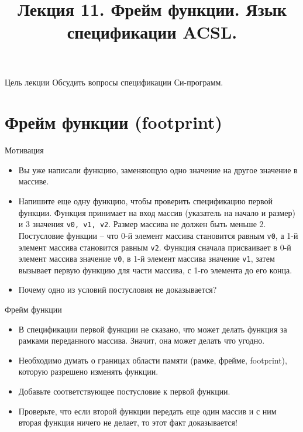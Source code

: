 \documentclass[hyperref={unicode=true}]{beamer}
\title{Лекция 11. Фрейм функции. Язык спецификации ACSL.}
\author{}
\date{}
\begin{document}
	\begin{frame}{}
		\titlepage
	\end{frame}

    \begin{frame}{Цель лекции}
    Обсудить вопросы спецификации Си-программ.
    \end{frame}

    \section{Фрейм функции (footprint)}

    \begin{frame}{Мотивация}
    \begin{itemize}
    \item
    Вы уже написали функцию, заменяющую
    одно значение на другое значение в массиве.
    \item
    Напишите еще одну функцию, чтобы проверить
    спецификацию первой функции. Функция принимает
    на вход массив (указатель на начало и размер)
    и 3 значения \texttt{v0, v1, v2}. Размер массива
    не должен быть меньше 2. Постусловие функции --
    что 0-й элемент массива становится равным
    \texttt{v0}, а 1-й элемент массива становится
    равным \texttt{v2}. Функция сначала присваивает
    в 0-й элемент массива значение \texttt{v0},
    в 1-й элемент массива значение \texttt{v1},
    затем вызывает первую функцию для части массива,
    с 1-го элемента до его конца.
    \item
    Почему одно из условий постусловия не доказывается?
    \end{itemize}
    \end{frame}

    \begin{frame}{Фрейм функции}
    \begin{itemize}
    \item
    В спецификации первой функции не сказано, что
    может делать функция за рамками переданного массива.
    Значит, она может делать что угодно.
    \item
    Необходимо думать о границах области памяти (рамке,
    фрейме, footprint), которую разрешено изменять функции.
    \item
    Добавьте соответствующее постусловие к первой функции.
    \item
    Проверьте, что если второй функции передать еще один массив
    и с ним вторая функция ничего не делает, то этот факт
    доказывается!
    \end{itemize}
    \end{frame}
\end{document}
